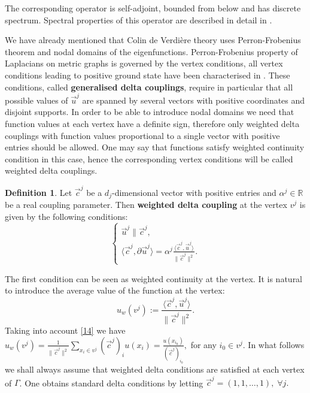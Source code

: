 \documentclass{amsart}
\theoremstyle{definition}
\newtheorem{definition}[theorem]{Definition}
\theoremstyle{remark}
\numberwithin{equation}{section}
\newcommand{\vu}{\vec{u}}
\newcommand{\de}{\partial}
\begin{document}
{The corresponding operator is self-adjoint, bounded from below and has discrete spectrum. Spectral properties of this operator are described in detail in \cite{BeKu,PK24}.

We have already mentioned that Colin de Verdi{\`e}re theory uses Perron-Frobenius theorem and   nodal domains of the eigenfunctions.
Perron-Frobenius property of Laplacians on metric graphs is governed by
 the vertex conditions, all vertex conditions leading to positive ground state have been characterised in \cite{Ku19,PK24}.
These conditions, called {\bf generalised delta couplings}, require in particular that all possible values of $ \vu^j$
are spanned by several vectors with positive coordinates and disjoint supports. In order to be able to introduce nodal domains we need that function values
at each vertex have a definite sign, therefore only weighted delta couplings with function values proportional to a single
vector with positive entries should be allowed. One may say that functions satisfy weighted continuity condition in this case, hence
the corresponding vertex conditions will be called  weighted delta couplings.

\begin{definition} \label{defgdc}
Let $ \vec{c}^j $ be a $d_j$-dimensional vector with positive entries and $ \alpha^j  \in \mathbb R $ be a real coupling parameter. Then  
{\bf weighted delta coupling} at the vertex $ v^j $ is given by the following conditions:
\begin{equation} \label{14}
\left\{
\begin{array}{l}
\vu^j \parallel \vec{c}^j,  \\[3mm]
\langle \vec{c}^j, \de\vu^j \rangle = \alpha^j  \frac{\langle \vec{c}^j, \vu^j \rangle}{\|\vec{c}^j\|^2}.
\end{array} \right.
\end{equation}
\end{definition}

The first condition can be seen as weighted continuity at the vertex.
It is natural to introduce the average value of the function at the vertex:
\begin{equation}
u_w (v^j) := \frac{ \langle \vec{c}^j, \vec{u}^j \rangle}{\| \vec{c}^j \|^2}. 
\end{equation}
Taking into account \eqref{14} we have
$ u_w(v^j)  = \frac{1}{\|\vec{c}^j\|^2}\sum_{x_i \in v^j} (\vec{c}^j)_i u(x_i) = \frac{u(x_{i_0})}{(\vec{c}^j)_{i_0}} ,$
for any $ i_0 \in v^j $.
In what follows we shall always assume that weighted delta conditions are satisfied at each vertex of $ \Gamma$. 
One obtains standard delta conditions by letting $ \vec{c}^j = (1,1, \dots, 1), \; \forall j. $

}
\end{document}
